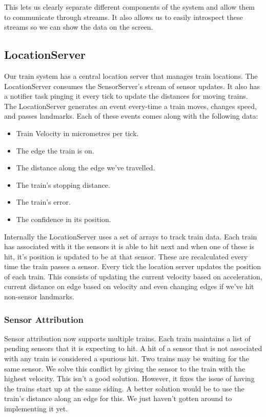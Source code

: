 \documentclass{article}
\begin{document}
This lets us clearly separate different components of the system and allow them to communicate through streams. It also allows us to easily introspect these streams so we can show the data on the screen.


\subsection{LocationServer}

Our train system has a central location server that manages train locations. The LocationServer consumes the SensorServer's stream of sensor updates. It also has a notifier task pinging it every tick to update the distances for moving trains. The LocationServer generates an event every-time a train moves, changes speed, and passes landmarks. Each of these events comes along with the following data:

\begin{itemize}
    \item Train Velocity in micrometres per tick.
    \item The edge the train is on.
    \item The distance along the edge we've travelled.
    \item The train's stopping distance.
    \item The train's error.
    \item The confidence in its position.
\end{itemize}

Internally the LocationServer uses a set of arrays to track train data. Each train has associated with it the sensors it is able to hit next and when one of these is hit, it's position is updated to be at that sensor. These are recalculated every time the train passes a sensor. Every tick the location server updates the position of each train. This consists of updating the current velocity based on acceleration, current distance on edge based on velocity and even changing edges if we've hit non-sensor landmarks.

\subsubsection{Sensor Attribution}

Sensor attribution now supports multiple trains. Each train maintains a list of pending sensors that it is expecting to hit. A hit of a sensor that is not associated with any train is considered a spurious hit. Two trains may be waiting for the same sensor. We solve this conflict by giving the sensor to the train with the highest velocity. This isn't a good solution. However, it fixes the issue of having the trains start up at the same siding. A better solution would be to use the train's distance along an edge for this. We just haven't gotten around to implementing it yet.
\end{document}
